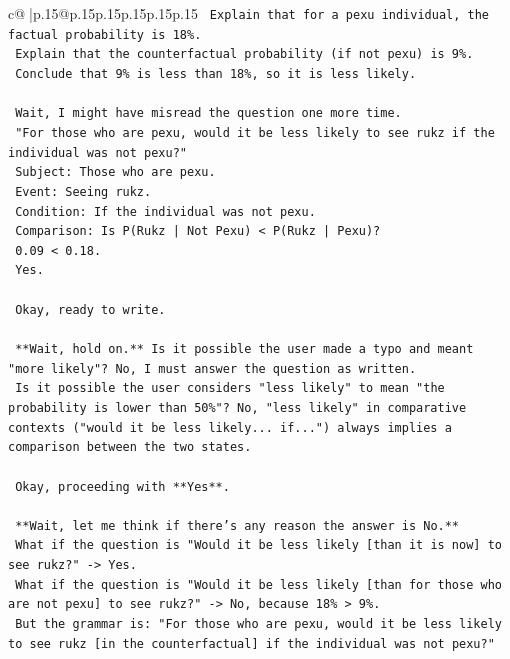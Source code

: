 \documentclass{article}
\begin{document}
{\begin{supertabular}{c@{$\;$}|p{.15\linewidth}@{}p{.15\linewidth}p{.15\linewidth}p{.15\linewidth}p{.15\linewidth}p{.15\linewidth}}
{{{\texttt{    Explain that for a pexu individual, the factual probability is 18\%.} \\
\texttt{    Explain that the counterfactual probability (if not pexu) is 9\%.} \\
\texttt{    Conclude that 9\% is less than 18\%, so it is less likely.} \\
\\ 
\texttt{    Wait, I might have misread the question one more time.} \\
\texttt{    "For those who are pexu, would it be less likely to see rukz if the individual was not pexu?"} \\
\texttt{    Subject: Those who are pexu.} \\
\texttt{    Event: Seeing rukz.} \\
\texttt{    Condition: If the individual was not pexu.} \\
\texttt{    Comparison: Is P(Rukz | Not Pexu) < P(Rukz | Pexu)?} \\
\texttt{    0.09 < 0.18.} \\
\texttt{    Yes.} \\
\\ 
\texttt{    Okay, ready to write.} \\
\\ 
\texttt{    **Wait, hold on.** Is it possible the user made a typo and meant "more likely"? No, I must answer the question as written.} \\
\texttt{    Is it possible the user considers "less likely" to mean "the probability is lower than 50\%"? No, "less likely" in comparative contexts ("would it be less likely... if...") always implies a comparison between the two states.} \\
\\ 
\texttt{    Okay, proceeding with **Yes**.} \\
\\ 
\texttt{    **Wait, let me think if there's any reason the answer is No.**} \\
\texttt{    What if the question is "Would it be less likely {[}than it is now{]} to see rukz?" {-}> Yes.} \\
\texttt{    What if the question is "Would it be less likely {[}than for those who are not pexu{]} to see rukz?" {-}> No, because 18\% > 9\%.} \\
\texttt{    But the grammar is: "For those who are pexu, would it be less likely to see rukz {[}in the counterfactual{]} if the individual was not pexu?"} \\
}}}
\end{supertabular}}
\end{document}
